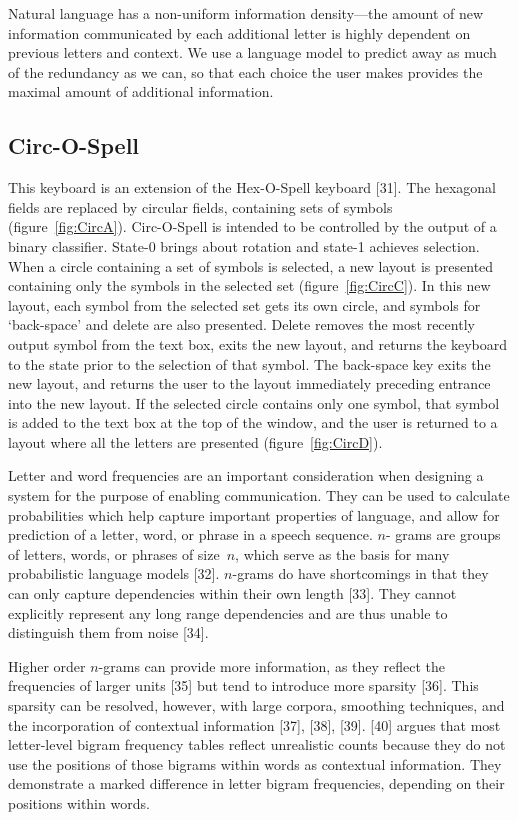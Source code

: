 \documentclass[12pt,titlepage]{article}
\begin{document}
Natural language has a non-uniform information density---the amount of new information 
communicated by each additional letter is highly dependent on previous letters and context. 
We use a language model to predict away as much of the redundancy as we can, so that each 
choice the user makes provides the maximal amount of additional information.

\subsection{Circ-O-Spell}

This keyboard is an extension of the Hex-O-Spell keyboard [31].  The hexagonal fields are replaced by 
circular fields, containing sets of symbols (figure~\ref{fig:CircA}).  Circ-O-Spell is intended to be controlled by the 
output of a binary classifier.  State-0 brings about rotation and state-1 achieves selection.  When a circle 
containing a set of symbols is selected, a new layout is presented containing only the symbols in the 
selected set (figure~\ref{fig:CircC}).  In this new layout, each symbol from the selected set gets its own circle, and 
symbols for `back-space' and delete are also presented.  Delete removes the most recently output 
symbol from the text box, exits the new layout, and returns the keyboard to the state prior to the 
selection of that symbol.  The back-space key exits the new layout, and returns the user to the layout 
immediately preceding entrance into the new layout.  If the selected circle contains only one symbol, 
that symbol is added to the text box at the top of the window, and the user is returned to a layout where 
all the letters are presented (figure~\ref{fig:CircD}).

Letter and word frequencies are an important consideration when designing a system for the purpose of 
enabling communication.  They can be used to calculate probabilities which help capture important 
properties of language, and allow for prediction of a letter, word, or phrase in a speech sequence.  $n$- 
grams are groups of letters, words, or phrases of size~$n$, which serve as the basis for many probabilistic 
language models [32].  $n$-grams do have shortcomings in that they can only capture dependencies within 
their own length [33].  They cannot explicitly represent any long range dependencies and are thus unable 
to distinguish them from noise [34].

Higher order $n$-grams can provide more information, as they reflect the frequencies of larger units [35] 
but tend to introduce more sparsity [36].  This sparsity can be resolved, however, with large corpora, 
smoothing techniques, and the incorporation of contextual information [37], [38], [39].  [40] argues that most letter-level
bigram frequency tables reflect unrealistic counts because they do not use the positions of  those 
bigrams within words as contextual information.  They demonstrate a marked difference in letter 
bigram frequencies, depending on their positions within words.
\end{document}

